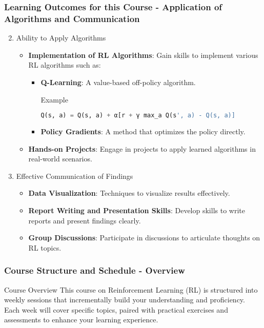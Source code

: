 \documentclass[aspectratio=169]{beamer}
\begin{document}
\begin{frame}[fragile]
    \frametitle{Learning Outcomes for this Course - Application of Algorithms and Communication}
    \begin{enumerate}
        \setcounter{enumi}{1} %
        \item Ability to Apply Algorithms
        \begin{itemize}
            \item \textbf{Implementation of RL Algorithms}: Gain skills to implement various RL algorithms such as:
                \begin{itemize}
                    \item \textbf{Q-Learning}: A value-based off-policy algorithm. 
                    \begin{block}{Example}
                    \begin{lstlisting}[language=Python]
                    Q(s, a) = Q(s, a) + α[r + γ max_a Q(s', a) - Q(s, a)]
                    \end{lstlisting}
                    \end{block}
                    \item \textbf{Policy Gradients}: A method that optimizes the policy directly.
                \end{itemize}
            \item \textbf{Hands-on Projects}: Engage in projects to apply learned algorithms in real-world scenarios.
        \end{itemize}
        
        \item Effective Communication of Findings
        \begin{itemize}
            \item \textbf{Data Visualization}: Techniques to visualize results effectively.
            \item \textbf{Report Writing and Presentation Skills}: Develop skills to write reports and present findings clearly.
            \item \textbf{Group Discussions}: Participate in discussions to articulate thoughts on RL topics.
        \end{itemize}
    \end{enumerate}
\end{frame}

\begin{frame}[fragile]
    \frametitle{Course Structure and Schedule - Overview}
    \begin{block}{Course Overview}
        This course on Reinforcement Learning (RL) is structured into weekly sessions that incrementally build your understanding and proficiency. 
        Each week will cover specific topics, paired with practical exercises and assessments to enhance your learning experience.
    \end{block}
\end{frame}
\end{document}
